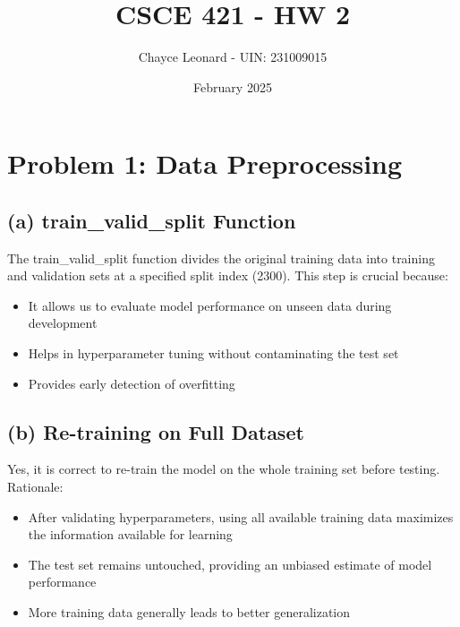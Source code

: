 \documentclass{article}
\title{CSCE 421 - HW 2}
\author{Chayce Leonard - UIN: 231009015}
\date{February 2025}
\begin{document}
\maketitle

\section*{Problem 1: Data Preprocessing}

\subsection*{(a) train\_valid\_split Function}
The train\_valid\_split function divides the original training data into training and validation sets at a specified split index (2300). This step is crucial because:
\begin{itemize}
    \item It allows us to evaluate model performance on unseen data during development
    \item Helps in hyperparameter tuning without contaminating the test set
    \item Provides early detection of overfitting
\end{itemize}

\subsection*{(b) Re-training on Full Dataset}
Yes, it is correct to re-train the model on the whole training set before testing. Rationale:
\begin{itemize}
    \item After validating hyperparameters, using all available training data maximizes the information available for learning
    \item The test set remains untouched, providing an unbiased estimate of model performance
    \item More training data generally leads to better generalization
\end{itemize}
\end{document}
